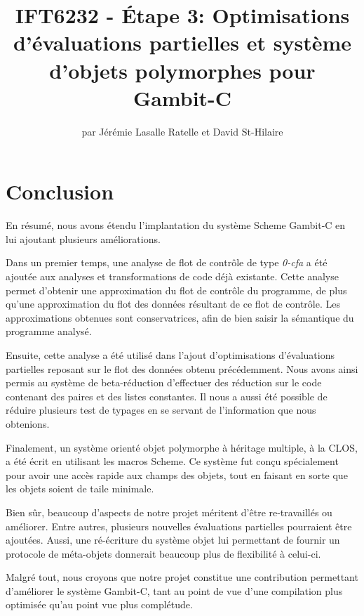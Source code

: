 \documentclass[letterpaper,12pt]{book}
\begin{document}
\title{IFT6232 - Étape 3: Optimisations d'évaluations partielles et
  système d'objets polymorphes pour Gambit-C}

\author{par Jérémie Lasalle Ratelle et David St-Hilaire}
\maketitle


\tableofcontents







\chapter{Conclusion}
  
  En résumé, nous avons étendu l'implantation du système Scheme
  Gambit-C en lui ajoutant plusieurs améliorations. 

  Dans un premier temps, une analyse de flot de contrôle de type
  \textit{0-cfa} a été ajoutée aux analyses et transformations de code
  déjà existante. Cette analyse permet d'obtenir une approximation du
  flot de contrôle du programme, de plus qu'une approximation du flot
  des données résultant de ce flot de contrôle. Les approximations
  obtenues sont conservatrices, afin de bien saisir la sémantique du
  programme analysé.

  Ensuite, cette analyse a été utilisé dans l'ajout d'optimisations
  d'évaluations partielles reposant sur le flot des données obtenu
  précédemment. Nous avons ainsi permis au système de beta-réduction
  d'effectuer des réduction sur le code contenant des paires et des
  listes constantes. Il nous a aussi été possible de réduire plusieurs
  test de typages en se servant de l'information que nous obtenions.

  Finalement, un système orienté objet polymorphe à héritage multiple,
  à la CLOS, a été écrit en utilisant les macros Scheme. Ce système
  fut conçu spécialement pour avoir une accès rapide aux champs des
  objets, tout en faisant en sorte que les objets soient de taile
  minimale. 

  Bien sûr, beaucoup d'aspects de notre projet méritent d'être
  re-travaillés ou améliorer. Entre autres, plusieurs nouvelles
  évaluations partielles pourraient être ajoutées. Aussi, une
  ré-écriture du système objet lui permettant de fournir un protocole
  de méta-objets donnerait beaucoup plus de flexibilité à celui-ci.

  Malgré tout, nous croyons que notre projet constitue une
  contribution permettant d'améliorer le système Gambit-C, tant au
  point de vue d'une compilation plus optimisée qu'au point vue plus
  complétude.





\end{document}
